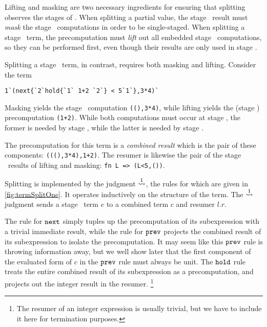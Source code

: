 Lifting and masking are two necessary ingredients for ensuring that splitting
observes the stages of \lang. When splitting a partial value, the stage \bbone\
result must \emph{mask} the stage \bbtwo\ computations in order to be
single-staged. When splitting a stage \bbtwo\ term, the precomputation must
\emph{lift} out all embedded stage \bbone\ computations, so they can be
performed first, even though their results are only used in stage \bbtwo.

Splitting a stage \bbone\ term, in contrast, requires both masking and lifting.
Consider the term 
\begin{lstlisting}
1`(next{`2`hold{`1` 1+2 `2`} < 5`1`},3*4)`
\end{lstlisting}
Masking yields the stage \bbone\ computation \verb|((),3*4)|, while lifting
yields the (stage \bbone) precomputation \verb|(1+2)|. While both computations
must occur at stage \bbone, the former is needed by stage \bbone, while the
latter is needed by stage \bbtwo.

The precomputation for this term is a \emph{combined result} which is
the pair of these components: \verb|(((),3*4),1+2)|. The resumer is
likewise the pair of the stage \bbtwo\ results of lifting and masking:
\verb|fn L => (L<5,())|.

Splitting is implemented by the judgment $\overset{ 1}\rightsquigarrow$,
the rules for which are given in \cref{fig:termSplitOne}.  
It operates inductively on the structure of the term.  
The $\overset{ 1}\rightsquigarrow$ judgment sends a stage \bbone\ term $e$ to a combined term
$c$ and resumer $l.r$. 

The rule for ${\tt next}$ simply tuples up the precomputation of its subexpression with a trivial immediate result,
while the rule for ${\tt prev}$ projects the combined result of its subexpression to isolate the precomputation.
It may seem like this ${\tt prev}$ rule is throwing information away, but we well show later that the first component 
of the evaluated form of $c$ in the ${\tt prev}$ rule must always be unit.
The ${\tt hold}$ rule treats the entire combined result of its subexpression as a precomputation, 
and projects out the integer result in the resumer.%
\footnote{The resumer of an integer expression is usually trivial, 
but we have to include it here for termination purposes.}

